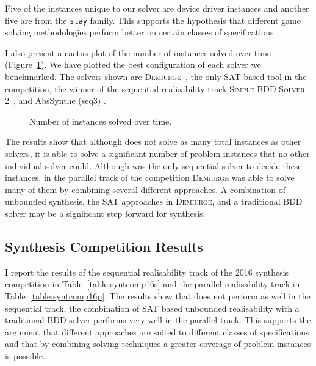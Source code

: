 Five of the instances unique to our solver are device driver instances and another five are from the \texttt{stay} family. This supports the hypothesis that different game solving methodologies perform better on certain classes of specifications.

I also present a cactus plot of the number of instances solved over time (Figure~\ref{fig:cactus}). We have plotted the best configuration of each solver we benchmarked. The solvers shown are \textsc{Demiurge}~\cite{Bloem14}, the only SAT-based tool in the competition, the winner of the sequential realisability track \textsc{Simple BDD Solver 2}~\cite{Walker14}, and AbsSynthe (seq3) \cite{Brenguier14}.

\begin{figure}
    \centering
    \pgfplotsset{width=\textwidth}
    \caption{Number of instances solved over time.}
    \label{fig:cactus}
\end{figure}

The results show that although \termitesat does not solve as many total instances as other solvers, it is able to solve a significant number of problem instances that no other individual solver could. Although \termitesat was the only sequential solver to decide these instances, in the parallel track of the competition \textsc{Demiurge} was able to solve many of them by combining several different approaches.  A combination of unbounded synthesis, the SAT approaches in \textsc{Demiurge}, and a traditional BDD solver may be a significant step forward for synthesis.

\clearpage
\subsection{Synthesis Competition Results}

I report the results of the sequential realisability track of the 2016 synthesis competition in Table~\ref{table:syntcomp16s} and the parallel realisability track in Table~\ref{table:syntcomp16p}. The results show that \termitesat does not perform as well in the sequential track, the combination of SAT based unbounded realisability with a traditional BDD solver performs very well in the parallel track. This supports the argument that different approaches are suited to different classes of specifications and that by combining solving techniques a greater coverage of problem instances is possible.

